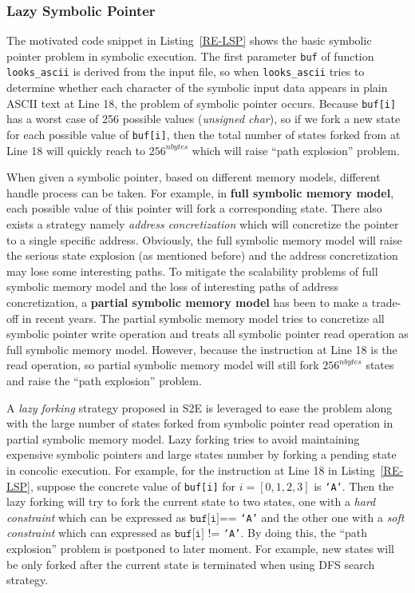 \subsubsection{Lazy Symbolic Pointer}
The motivated code snippet in Listing~\ref{RE-LSP} shows the basic symbolic pointer problem in symbolic execution. 
The first parameter \texttt{buf} of function \texttt{looks\_ascii} is derived from the input file, so when \texttt{looks\_ascii} tries to determine whether each character of the symbolic input data appears in plain ASCII text at Line 18, the problem of symbolic pointer occurs. Because \texttt{buf[i]} has a worst case of 256 possible values (\textit{unsigned char}), so if we fork a new state for each possible value of \texttt{buf[i]}, then the total number of states forked from at Line 18 will quickly reach to $256^{nbytes}$ which will raise ``path explosion'' problem.

When given a symbolic pointer, based on different memory models, different handle process can be taken. For example, in \textbf{full symbolic memory model}, each possible value of this pointer will fork a corresponding state. There also exists a strategy namely \textit{address concretization} which will concretize the pointer to a single specific address. Obviously, the full symbolic memory model will raise the serious state explosion (as mentioned before) and the address concretization may lose some interesting paths. To mitigate the scalability problems of full symbolic memory model and the loss of interesting paths of address concretization, a \textbf{partial symbolic memory model} has been to make a trade-off in recent years. The partial symbolic memory model tries to concretize all symbolic pointer write operation and treats all symbolic pointer read operation as full symbolic memory model. However, because the instruction at Line 18 is the read operation, so partial symbolic memory model will still fork $256^{nbytes}$ states and raise the ``path explosion'' problem.

A \textit{lazy forking} strategy proposed in S2E is leveraged to ease the problem along with the large number of states forked from symbolic pointer read operation in partial symbolic memory model. 
Lazy forking tries to avoid maintaining expensive symbolic pointers and large states number by forking a pending state in concolic execution. 
For example, for the instruction at Line 18 in Listing~\ref{RE-LSP}, suppose the concrete value of \texttt{buf[i]} for $i=[0,1,2,3]$ is \texttt{`A'}. Then the lazy forking will try to fork the current state to two states, one with a \textit{hard constraint} which can be expressed as $\texttt{buf[i]}$== \texttt{`A'} and the other one with a \textit{soft constraint} which can expressed as $\texttt{buf[i]}$ != \texttt{`A'}.
By doing this, the ``path explosion'' problem is postponed to later moment. For example, new states will be only forked after the current state is terminated when using DFS search strategy.

